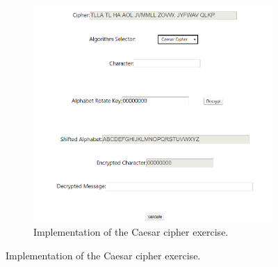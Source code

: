 \documentclass{l4proj}
\begin{document}
\begin{figure}
    \centering
    \begin{subfigure}[b]{0.65\textwidth}
        \includegraphics[width=\textwidth, frame]{images/CaesarImplementation.PNG}
        \caption{Implementation of the Caesar cipher exercise.}
        \label{fig:CaesarImp}
    \end{subfigure}


\end{figure}
\end{document}
